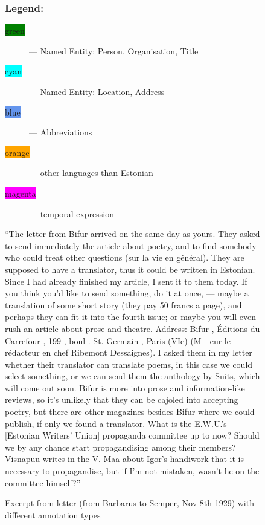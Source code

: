 \documentclass[runningheads]{llncs}
\begin{document}
\begin{figure}
\begin{minipage}{0.9\textwidth}
    \subsubsection{Legend:}
    \begin{description}
\item[\colorbox{Green}{green}] --- Named Entity: Person, Organisation, Title
\item[\colorbox{Cyan}{cyan}] --- Named Entity: Location, Address
\item[\colorbox{CornflowerBlue}{blue}] --- Abbreviations
\item[\colorbox{Orange}{orange}] --- other languages than Estonian
\item[\colorbox{Magenta}{magenta}] --- temporal expression
\end{description}
\end{minipage}
\begin{minipage}{0.9\textwidth}
  \vspace{18pt}
  ``The letter from Bifur arrived on the same day as yours. They asked to send immediately the article about poetry, and to find somebody who could treat other questions (sur la vie en g\'en\'eral). They are supposed to have a translator, thus it could be written in Estonian. Since I had already finished my article, I sent it to them today. If you think you’d like to send something, do it at once, --- maybe a translation of some short story (they pay 50 francs a page), and perhaps they can fit it into the fourth issue; or maybe you will even rush an article about prose and theatre. Address: Bifur , \'Editions du Carrefour , 199 , boul . St.-Germain , Paris (VIe) (M---eur le r\'edacteur en chef Ribemont Dessaignes). I asked them in my letter whether their translator can translate poems, in this case we could select something, or we can send them the anthology by Suits, which will come out soon. Bifur is more into prose and information-like reviews, so it's unlikely that they can be cajoled into accepting poetry, but there are other magazines besides Bifur where we could publish, if only we found a translator. What is the E.W.U.'s [Estonian Writers' Union] propaganda committee up to now? Should we by any chance start propagandising among their members? Visnapuu writes in the V.-Maa about Igor's handiwork that it is necessary to propagandise, but if I'm not mistaken, wasn't he on the committee himself?''
  \end{minipage}
  \caption{Excerpt from letter (from Barbarus to Semper, Nov 8th 1929) with different annotation types}\label{fig1}
\end{figure}
\end{document}
